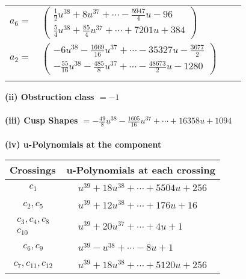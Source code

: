 \documentclass[1p]{elsarticle_modified}
\theoremstyle{definition}
\begin{document}
\begin{tabular}{m{7pt} m{180pt} m{7pt} m{180pt} }
\flushright $a_{6}=$&$\begin{pmatrix}\frac{1}{2} u^{38}+8 u^{37}+\cdots-\frac{5947}{4} u-96\\\frac{5}{4} u^{38}+\frac{85}{4} u^{37}+\cdots+7201 u+384\end{pmatrix}$ \\
\flushright $a_{2}=$&$\begin{pmatrix}-6 u^{38}-\frac{1669}{16} u^{37}+\cdots-35327 u-\frac{3677}{2}\\-\frac{55}{16} u^{38}-\frac{485}{8} u^{37}+\cdots-\frac{48673}{2} u-1280\end{pmatrix}$\\&\end{tabular}
\flushleft \textbf{(ii) Obstruction class $= -1$}\\~\\
\flushleft \textbf{(iii) Cusp Shapes $= -\frac{49}{8} u^{38}-\frac{1605}{16} u^{37}+\cdots+16358 u+1094$}\\~\\
\newpage\renewcommand{\arraystretch}{1}
\flushleft \textbf{(iv) u-Polynomials at the component}\newline \\
\begin{tabular}{m{50pt}|m{274pt}}
Crossings & \hspace{64pt}u-Polynomials at each crossing \\
\hline $$\begin{aligned}c_{1}\end{aligned}$$&$\begin{aligned}
&u^{39}+18 u^{38}+\cdots+5504 u+256
\end{aligned}$\\
\hline $$\begin{aligned}c_{2},c_{5}\end{aligned}$$&$\begin{aligned}
&u^{39}+12 u^{38}+\cdots+176 u+16
\end{aligned}$\\
\hline $$\begin{aligned}c_{3},c_{4},c_{8}\\c_{10}\end{aligned}$$&$\begin{aligned}
&u^{39}+20 u^{37}+\cdots+4 u+1
\end{aligned}$\\
\hline $$\begin{aligned}c_{6},c_{9}\end{aligned}$$&$\begin{aligned}
&u^{39}- u^{38}+\cdots-8 u+1
\end{aligned}$\\
\hline $$\begin{aligned}c_{7},c_{11},c_{12}\end{aligned}$$&$\begin{aligned}
&u^{39}+18 u^{38}+\cdots+5120 u+256
\end{aligned}$\\
\hline
\end{tabular}\\~\\
\end{document}
